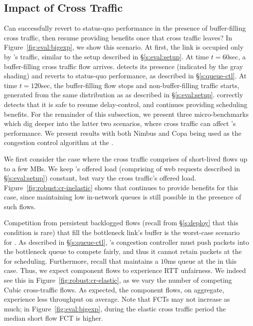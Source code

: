 \subsection{Impact of Cross Traffic}\label{s:robust:cross}


Can \name successfully revert to status-quo performance in the presence of buffer-filling cross traffic, then resume providing benefits once that cross traffic leaves?
In Figure~\ref{fig:eval:bigexp}, we show this scenario.
At first, the link is occupied only by \name's traffic, similar to the setup described in \S\ref{s:eval:setup}.
At time $t=60$sec, a buffer-filling cross traffic flow arrives.
\name detects its presence (indicated by the gray shading) and reverts to status-quo performance, as described in \S\ref{s:queue-ctl}.
At time $t=120$sec, the buffer-filling flow stops and non-buffer-filling traffic starts, generated from the same distribution as \name as described in \S\ref{s:eval:setup}.
\name correctly detects that it is safe to resume delay-control, and continues providing scheduling benefits.
For the remainder of this subsection, we present three micro-benchmarks which dig deeper into the latter two scenarios, where cross traffic can affect \name's performance. 
We present results with both Nimbus and Copa being used as the congestion control algorithm at the \inbox.


 We first consider the case where the cross traffic comprises of short-lived flows up to a few MBs.
We keep \name's offered load (comprising of web requests described in \S\ref{s:eval:setup}) constant, but vary the cross traffic's offered load.
Figure~\ref{fig:robust:cr-inelastic} shows that \name continues to provide benefits for this case, since maintaining low in-network queues is still possible in the presence of such flows.



 Competition from persistent backlogged flows (recall from \S\ref{s:deploy} that this condition is rare) that fill the bottleneck link's buffer is the worst-case scenario for \name.
As described in \S\ref{s:queue-ctl}, \name's congestion controller must push packets into the bottleneck queue to compete fairly, and thus it cannot retain packets at the \inbox for scheduling. 
Furthermore, recall that \name maintains a $10$ms queue at the \inbox in this case. Thus, we expect component flows to experience RTT unfairness.
We indeed see this in Figure~\ref{fig:robust:cr-elastic}, as we vary the number of competing Cubic cross-traffic flows.
As expected, the component flows, on aggregate, experience \bundlerElasticTputWorseness less throughput on average.
Note that FCTs may not increase as much; in Figure~\ref{fig:eval:bigexp}, during the elastic cross traffic period the median short flow FCT is
\bigexpElasticSlowdownWorseness higher.

